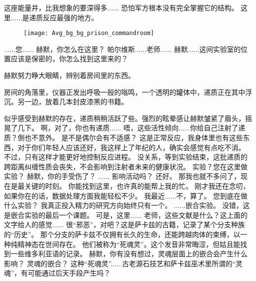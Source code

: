 \documentclass[openany]{book}
\begin{document}
\begin{dialogue}
     这座能量井，比我想象的要深得多......
     恐怕军方根本没有完全掌握它的结构。
     这里......是递质反应最强的地方。
    \begin{figure}[h]
        \centering
        \texttt{[image: Avg\_bg\_bg\_prison\_commandroom]}
    \end{figure}
     ......您......
     赫默，你怎么在这里？
     帕尔维斯......老师......
     赫默......这间实验室的位置应该是保密的，你怎么找到这里来的？\par
    赫默努力睁大眼睛，辨别着房间里的东西。\par
    房间的角落里，仪器正发出呼吸一般的嗡鸣，一个透明的罐体中，递质正在其中浮沉。另一边，放着几本封皮漆黑的书籍。\par
    似乎感受到赫默的存在，递质稍稍活跃了些。强烈的眩晕感让赫默皱紧了眉头，摇晃了几下。
     啊，对了，你也有递质......
     唔，这些活性倾向......你给自己注射了递质？倒也不意外。
     是不是偶尔会有不适感？
     这是正常反应，我身体里也有这些东西，对于你们年轻人应该还好，我这样上了年纪的人，确实会感觉有点吃不消。
     不过，只有这样才能更好地控制反应进程。
     没关系，等到实验结束，这批递质的跨距离纠缠性质会丧失，不会影响到注射者未来的健康状况。
     实验？您在这里做实验？
     赫默，你的手受伤了？
     ......
     影响活动吗？
     还好。
     那我也就不多问了，现在是最关键的时刻。
     你能找到这里，也许真的能帮上我的忙。
     刚才我还在念叨，如果你在的话，数据处理方面我能轻松不少。
     我最近......不，算了。
     您到底在做什么实验？
     我真正投入精力的研究方向始终只有一个。
     ......嵌合实验。
     没错，这是嵌合实验的最后一个课题。
     可是，这里......
     老师，这些文献是什么？这上面的文字给人的感觉......
     很“邪恶”，对吧？这是萨卡兹的古籍，记录了某个分支种族的“历史”。
     那个分支的萨卡兹不仅拥有长久的生命，还能跨越肉体的束缚，以一种纯精神态在世间存在。
     他们被称为“死魂灵”。这个发音非常晦涩，但姑且能找到一些维多利亚语的记录。
     赫默，你有没有想过，灵魂层面上的嵌合会产生什么影响？
     灵魂的嵌合？
     这种“死魂灵”......古老源石技艺和萨卡兹巫术里所谓的“灵魂”，有可能通过后天手段产生吗？

\end{dialogue}
\end{document}
